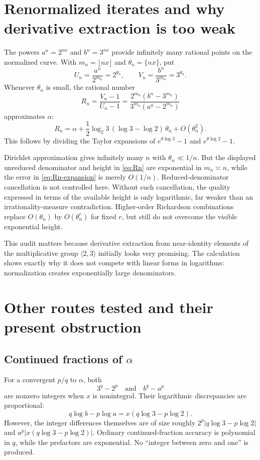 \documentclass[11pt]{article}
\theoremstyle{definition}
\begin{document}
\section{Renormalized iterates and why derivative extraction is too weak}\label{sec:renorm}

The powers $a^n=2^{nx}$ and $b^n=3^{nx}$ provide infinitely many rational points on the normalized curve.  With $m_n=\lfloor nx\rfloor$ and $\theta_n=\{nx\}$, put
\[
 U_n=\frac{a^n}{2^{m_n}}=2^{\theta_n},\qquad
 V_n=\frac{b^n}{3^{m_n}}=3^{\theta_n}.
\]
Whenever $\theta_n$ is small, the rational number
\begin{equation}\label{eq:Rn}
 R_n=\frac{V_n-1}{U_n-1}
 =\frac{2^{m_n}(b^n-3^{m_n})}{3^{m_n}(a^n-2^{m_n})}
\end{equation}
approximates $\alpha$:
\begin{equation}\label{eq:Rn-expansion}
 R_n=\alpha+\frac12\log_2 3\,(\log3-\log2)\,\theta_n+O(\theta_n^2).
\end{equation}
This follows by dividing the Taylor expansions of $e^{\theta\log3}-1$ and $e^{\theta\log2}-1$.

Dirichlet approximation gives infinitely many $n$ with $\theta_n\ll1/n$.  But the displayed
unreduced denominator and height in \eqref{eq:Rn} are exponential in $m_n\asymp n$, while
the error in \eqref{eq:Rn-expansion} is merely $O(1/n)$.  Reduced-denominator cancellation
is not controlled here.  Without such cancellation, the quality expressed in terms of the
available height is only logarithmic, far weaker than an irrationality-measure contradiction.
Higher-order Richardson combinations replace $O(\theta_n)$ by $O(\theta_n^r)$ for fixed
$r$, but still do not overcome the visible exponential height.

This audit matters because derivative extraction from near-identity elements of the multiplicative group $\langle2,3\rangle$ initially looks very promising.  The calculation shows exactly why it does not compete with linear forms in logarithms: normalization creates exponentially large denominators.

\section{Other routes tested and their present obstruction}\label{sec:no-go}

\subsection{Continued fractions of $\alpha$}
For a convergent $p/q$ to $\alpha$, both
\[
 3^q-2^p\quad\text{and}\quad b^q-a^p
\]
are nonzero integers when $x$ is nonintegral.  Their logarithmic discrepancies are proportional:
\[
 q\log b-p\log a=x(q\log3-p\log2).
\]
However, the integer differences themselves are of size roughly $2^p|q\log3-p\log2|$ and $a^p|x(q\log3-p\log2)|$.  Ordinary continued-fraction accuracy is polynomial in $q$, while the prefactors are exponential.  No ``integer between zero and one'' is produced.
\end{document}
